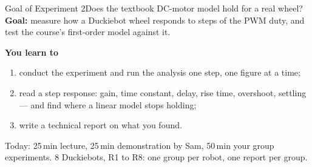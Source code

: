 %
\begin{frame}{Goal of Experiment 2}{Does the textbook DC-motor model hold for a real wheel?}
  \small
  \textbf{Goal:} measure how a Duckiebot wheel responds to \alert{steps of the PWM duty}, and test the course's first-order model against it.

  \vspace{8pt}
  \textbf{You learn to}
  \begin{enumerate}\setlength{\itemsep}{4pt}
    \item \alert{conduct the experiment} and run the analysis \alert{one step, one figure at a time};
    \item read a step response: gain, time constant, delay, rise time, overshoot, settling --- and find where a \alert{linear model} stops holding;
    \item write a \alert{technical report} on what you found.
  \end{enumerate}

  \vfill
  {\footnotesize Today: 25\,min lecture, 25\,min demonstration by Sam, 50\,min your group experiments. 8 Duckiebots, R1 to R8: one group per robot, one report per group.}
\end{frame}
